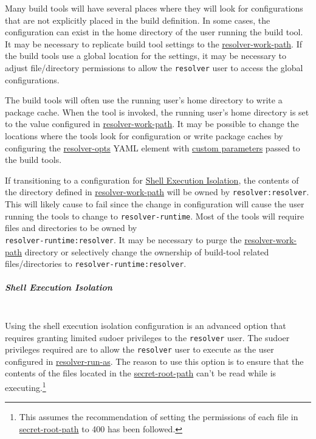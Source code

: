 Many build tools will have several places where they will look for configurations that are not explicitly placed in the build
definition.  In some cases, the configuration can exist in the home directory of the user running the build tool.  It may be necessary
to replicate build tool settings to the \hyperref[sec:agent-resolver-work-path]{resolver-work-path}.  If the build tools use a global location
for the settings, it may be necessary to adjust file/directory permissions to allow the \texttt{resolver} user to access the global
configurations.

The build tools will often use the running user's home directory to write a package cache.  When the tool is invoked,
the running user's home directory is set to the value configured in \hyperref[sec:agent-resolver-work-path]{resolver-work-path}.
It may be possible to change the locations where the tools look for configuration or write package caches by configuring the
\hyperref[sec:agent-resolver-opts]{resolver-opts} YAML element with
\href{https://docs.checkmarx.com/en/34965-132888-checkmarx-sca-resolver-configuration-arguments.html#UUID-bc93274b-c1c7-ea47-9556-3bd8900711dc_id_CheckmarxSCAResolverConfigurationArguments-CustomParameters}
{custom parameters} passed to the build tools.

If transitioning to a configuration for \hyperref[par:shell-agent-isolation]{Shell Execution Isolation}, the contents of the directory
defined in \hyperref[sec:agent-resolver-work-path]{resolver-work-path} will be owned by \texttt{resolver:resolver}.  This will likely
cause \scaresolver to fail since the change in configuration will cause the user running the tools to change to
\texttt{resolver-runtime}.  Most of the tools will require files and directories to be owned by\\\texttt{resolver-runtime:resolver}.
It may be necessary to purge the \hyperref[sec:agent-resolver-work-path]{resolver-work-path} directory or selectively change
the ownership of build-tool related files/directories to \texttt{resolver-runtime:resolver}.


\subparagraph{Shell Execution Isolation}\label{par:shell-agent-isolation}
\noindent\\Using the shell execution isolation configuration is an advanced option that requires granting limited sudoer privileges
to the \texttt{resolver} user.  The sudoer privileges required are to allow the \texttt{resolver} user to execute \scaresolver
as the user configured in \hyperref[sec:agent-resolver-run-as]{resolver-run-as}.  The reason to use this option is to ensure that
the contents of the files located in the \hyperref[sec:yaml-secret-root-path]{secret-root-path} can't be read while \scaresolver
is executing.\footnote{This assumes the recommendation of setting the permissions of each file in 
\hyperref[sec:yaml-secret-root-path]{secret-root-path} to 400 has been followed.}

